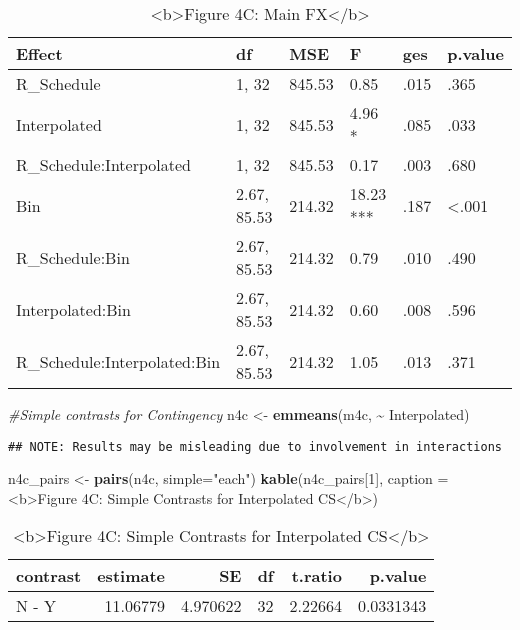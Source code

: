 \documentclass[
]{article}
\newenvironment{Shaded}{\begin{snugshade}}{\end{snugshade}}
\newcommand{\AttributeTok}[1]{\textcolor[rgb]{0.13,0.29,0.53}{#1}}
\newcommand{\CommentTok}[1]{\textcolor[rgb]{0.56,0.35,0.01}{\textit{#1}}}
\newcommand{\DecValTok}[1]{\textcolor[rgb]{0.00,0.00,0.81}{#1}}
\newcommand{\FunctionTok}[1]{\textcolor[rgb]{0.13,0.29,0.53}{\textbf{#1}}}
\newcommand{\NormalTok}[1]{#1}
\newcommand{\OtherTok}[1]{\textcolor[rgb]{0.56,0.35,0.01}{#1}}
\newcommand{\SpecialCharTok}[1]{\textcolor[rgb]{0.81,0.36,0.00}{\textbf{#1}}}
\newcommand{\StringTok}[1]{\textcolor[rgb]{0.31,0.60,0.02}{#1}}
\begin{document}
\begin{longtable}[l]{llllll}
\caption{\label{tab:unnamed-chunk-8}<b>Figure 4C: Main FX</b>}\\
\toprule
Effect & df & MSE & F & ges & p.value\\
\midrule
R\_Schedule & 1, 32 & 845.53 & 0.85 & .015 & .365\\
Interpolated & 1, 32 & 845.53 & 4.96 * & .085 & .033\\
R\_Schedule:Interpolated & 1, 32 & 845.53 & 0.17 & .003 & .680\\
Bin & 2.67, 85.53 & 214.32 & 18.23 *** & .187 & <.001\\
R\_Schedule:Bin & 2.67, 85.53 & 214.32 & 0.79 & .010 & .490\\
\addlinespace
Interpolated:Bin & 2.67, 85.53 & 214.32 & 0.60 & .008 & .596\\
R\_Schedule:Interpolated:Bin & 2.67, 85.53 & 214.32 & 1.05 & .013 & .371\\
\bottomrule
\end{longtable}

\begin{Shaded}
\begin{Highlighting}[]
\CommentTok{\#Simple contrasts for Contingency}
\NormalTok{n4c }\OtherTok{\textless{}{-}} \FunctionTok{emmeans}\NormalTok{(m4c, }\SpecialCharTok{\textasciitilde{}}\NormalTok{ Interpolated)}
\end{Highlighting}
\end{Shaded}

\begin{verbatim}
## NOTE: Results may be misleading due to involvement in interactions
\end{verbatim}

\begin{Shaded}
\begin{Highlighting}[]
\NormalTok{n4c\_pairs }\OtherTok{\textless{}{-}} \FunctionTok{pairs}\NormalTok{(n4c, }\AttributeTok{simple=}\StringTok{"each"}\NormalTok{)}
\FunctionTok{kable}\NormalTok{(n4c\_pairs[}\DecValTok{1}\NormalTok{], }\AttributeTok{caption =} \StringTok{\textquotesingle{}\textless{}b\textgreater{}Figure 4C: Simple Contrasts for Interpolated CS\textless{}/b\textgreater{}\textquotesingle{}}\NormalTok{)}
\end{Highlighting}
\end{Shaded}

\begin{table}
\caption{\label{tab:unnamed-chunk-8}<b>Figure 4C: Simple Contrasts for Interpolated CS</b>}

\centering
\begin{tabular}[t]{l|r|r|r|r|r}
\hline
contrast & estimate & SE & df & t.ratio & p.value\\
\hline
N - Y & 11.06779 & 4.970622 & 32 & 2.22664 & 0.0331343\\
\hline
\end{tabular}
\end{table}
\end{document}
